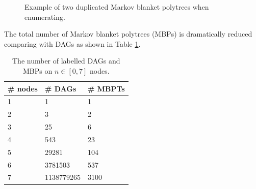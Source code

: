 \begin{figure}
	\hspace*{\fill}%
	\hfill%
	\hspace*{\fill}%
	\caption{Example of two duplicated Markov blanket polytrees when enumerating.}
	\label{enum_duplicated}
\end{figure}

The total number of Markov blanket polytrees (MBPs) is dramatically reduced comparing with DAGs as shown in Table \ref{tb:nmbps}.

\begin{table}[]
\centering
\caption{The number of labelled DAGs and MBPs on $n \in [0, 7]$ nodes.}
\label{tb:nmbps}
\begin{tabular}{lll}
\hline
\# nodes & \# DAGs    & \# MBPTs \\ \hline
1        & 1          & 1        \\
2        & 3          & 2        \\
3        & 25         & 6        \\
4        & 543        & 23       \\
5        & 29281      & 104      \\
6        & 3781503    & 537      \\
7        & 1138779265 & 3100     \\ \hline
\end{tabular}
\end{table}

